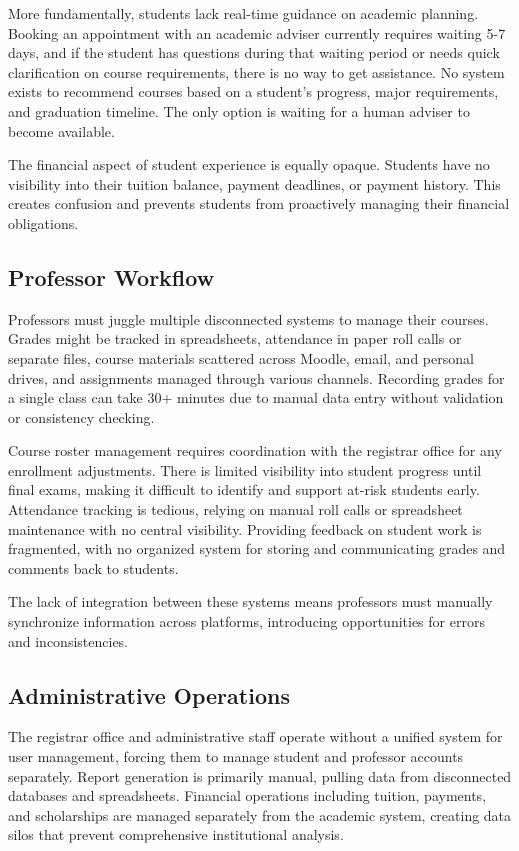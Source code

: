 \documentclass[12pt,a4paper]{report}
\begin{document}
More fundamentally, students lack real-time guidance on academic planning. Booking an appointment with an academic adviser currently requires waiting 5-7 days, and if the student has questions during that waiting period or needs quick clarification on course requirements, there is no way to get assistance. No system exists to recommend courses based on a student's progress, major requirements, and graduation timeline. The only option is waiting for a human adviser to become available.

The financial aspect of student experience is equally opaque. Students have no visibility into their tuition balance, payment deadlines, or payment history. This creates confusion and prevents students from proactively managing their financial obligations.

\subsection{Professor Workflow}

Professors must juggle multiple disconnected systems to manage their courses. Grades might be tracked in spreadsheets, attendance in paper roll calls or separate files, course materials scattered across Moodle, email, and personal drives, and assignments managed through various channels. Recording grades for a single class can take 30+ minutes due to manual data entry without validation or consistency checking.

Course roster management requires coordination with the registrar office for any enrollment adjustments. There is limited visibility into student progress until final exams, making it difficult to identify and support at-risk students early. Attendance tracking is tedious, relying on manual roll calls or spreadsheet maintenance with no central visibility. Providing feedback on student work is fragmented, with no organized system for storing and communicating grades and comments back to students.

The lack of integration between these systems means professors must manually synchronize information across platforms, introducing opportunities for errors and inconsistencies.

\subsection{Administrative Operations}

The registrar office and administrative staff operate without a unified system for user management, forcing them to manage student and professor accounts separately. Report generation is primarily manual, pulling data from disconnected databases and spreadsheets. Financial operations including tuition, payments, and scholarships are managed separately from the academic system, creating data silos that prevent comprehensive institutional analysis.
\end{document}
